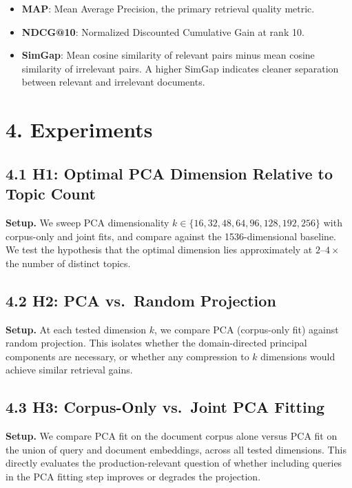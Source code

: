 \documentclass[
  11pt,
  letterpaper,
]{article}
\providecommand{\tightlist}{%
  \setlength{\itemsep}{0pt}\setlength{\parskip}{0pt}}
\begin{document}
\begin{itemize}
\tightlist
\item
  \textbf{MAP}: Mean Average Precision, the primary retrieval quality
  metric.
\item
  \textbf{NDCG@10}: Normalized Discounted Cumulative Gain at rank 10.
\item
  \textbf{SimGap}: Mean cosine similarity of relevant pairs minus mean
  cosine similarity of irrelevant pairs. A higher SimGap indicates
  cleaner separation between relevant and irrelevant documents.
\end{itemize}

\section{4. Experiments}\label{experiments}

\subsection{4.1 H1: Optimal PCA Dimension Relative to Topic
Count}\label{h1-optimal-pca-dimension-relative-to-topic-count}

\textbf{Setup.} We sweep PCA dimensionality
\(k \in \{16, 32, 48, 64, 96, 128, 192, 256\}\) with corpus-only and
joint fits, and compare against the 1536-dimensional baseline. We test
the hypothesis that the optimal dimension lies approximately at
\(2\)--\(4\times\) the number of distinct topics.

\subsection{4.2 H2: PCA vs.~Random
Projection}\label{h2-pca-vs.-random-projection}

\textbf{Setup.} At each tested dimension \(k\), we compare PCA
(corpus-only fit) against random projection. This isolates whether the
domain-directed principal components are necessary, or whether any
compression to \(k\) dimensions would achieve similar retrieval gains.

\subsection{4.3 H3: Corpus-Only vs.~Joint PCA
Fitting}\label{h3-corpus-only-vs.-joint-pca-fitting}

\textbf{Setup.} We compare PCA fit on the document corpus alone versus
PCA fit on the union of query and document embeddings, across all tested
dimensions. This directly evaluates the production-relevant question of
whether including queries in the PCA fitting step improves or degrades
the projection.
\end{document}

